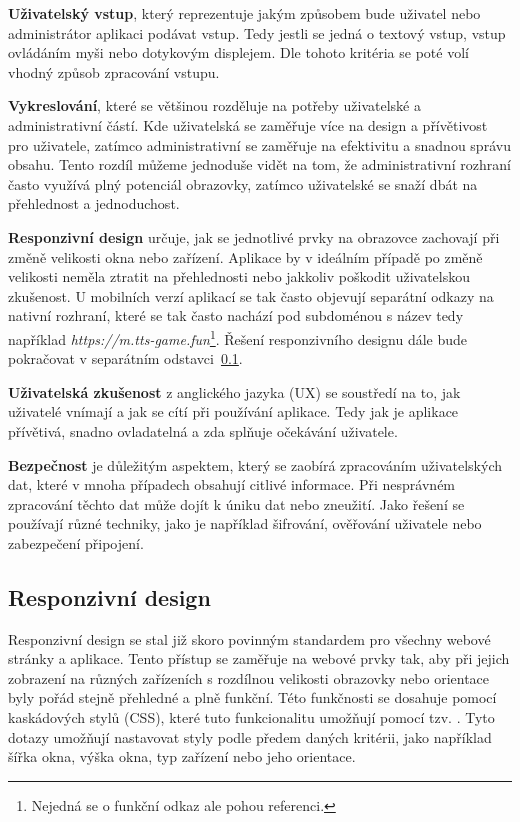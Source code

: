 \begin{description}
    \item \textbf{Uživatelský vstup}, který reprezentuje jakým způsobem bude uživatel nebo administrátor aplikaci podávat vstup. Tedy jestli se jedná o textový vstup, vstup ovládáním myši nebo dotykovým displejem. Dle tohoto kritéria se poté volí vhodný způsob zpracování vstupu.
    \item \textbf{Vykreslování}, které se většinou rozděluje na potřeby uživatelské a administrativní částí. Kde uživatelská se zaměřuje více na design a přívětivost pro uživatele, zatímco administrativní se zaměřuje na efektivitu a snadnou správu obsahu. Tento rozdíl můžeme jednoduše vidět na tom, že administrativní rozhraní často využívá plný potenciál obrazovky, zatímco uživatelské se snaží dbát na přehlednost a jednoduchost.
    \item \textbf{Responzivní design} určuje, jak se jednotlivé prvky na obrazovce zachovají při změně velikosti okna nebo zařízení. Aplikace by v ideálním případě po změně velikosti neměla ztratit na přehlednosti nebo jakkoliv poškodit uživatelskou zkušenost. U mobilních verzí aplikací se tak často objevují separátní odkazy na nativní rozhraní, které se tak často nachází pod subdoménou s název  tedy například \textit{https://m.tts-game.fun}\footnote{Nejedná se o funkční odkaz ale pohou referenci.}. Řešení responzivního designu dále bude pokračovat v separátním odstavci~\ref{subsec:ui-gui-theory-responsive-design}.
    \item \textbf{Uživatelská zkušenost} z anglického jazyka \textit{} (UX) se soustředí na to, jak uživatelé vnímají a jak se cítí při používání aplikace. Tedy jak je aplikace přívětivá, snadno ovladatelná a zda splňuje očekávání uživatele.
    \item \textbf{Bezpečnost} je důležitým aspektem, který se zaobírá zpracováním uživatelských dat, které v mnoha případech obsahují citlivé informace. Při nesprávném zpracování těchto dat může dojít k úniku dat nebo zneužití. Jako řešení se používají různé techniky, jako je například šifrování, ověřování uživatele nebo zabezpečení připojení.
\end{description}

\subsection{Responzivní design}
\label{subsec:ui-gui-theory-responsive-design}
Responzivní design se stal již skoro povinným standardem pro všechny webové stránky a aplikace. Tento přístup se zaměřuje na webové prvky tak, aby při jejich zobrazení na různých zařízeních s rozdílnou velikosti obrazovky nebo orientace byly pořád stejně přehledné a plně funkční. Této funkčnosti se dosahuje pomocí kaskádových stylů (CSS), které tuto funkcionalitu umožňují pomocí tzv. \textit{}. Tyto dotazy umožňují nastavovat styly podle předem daných kritérii, jako například šířka okna, výška okna, typ zařízení nebo jeho orientace.

